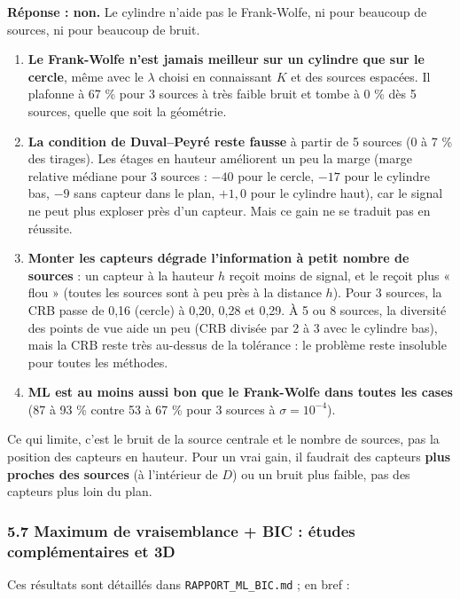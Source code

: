 \documentclass[
  french,
]{article}
\providecommand{\tightlist}{%
  \setlength{\itemsep}{0pt}\setlength{\parskip}{0pt}}
\begin{document}
\textbf{Réponse : non.} Le cylindre n'aide pas le Frank-Wolfe, ni pour
beaucoup de sources, ni pour beaucoup de bruit.

\begin{enumerate}
\def\labelenumi{\arabic{enumi}.}
\tightlist
\item
  \textbf{Le Frank-Wolfe n'est jamais meilleur sur un cylindre que sur
  le cercle}, même avec le \(\lambda\) choisi en connaissant \(K\) et
  des sources espacées. Il plafonne à 67 \% pour 3 sources à très faible
  bruit et tombe à 0 \% dès 5 sources, quelle que soit la géométrie.
\item
  \textbf{La condition de Duval--Peyré reste fausse} à partir de 5
  sources (0 à 7 \% des tirages). Les étages en hauteur améliorent un
  peu la marge (marge relative médiane pour 3 sources : \(-40\) pour le
  cercle, \(-17\) pour le cylindre bas, \(-9\) sans capteur dans le
  plan, \(+1{,}0\) pour le cylindre haut), car le signal ne peut plus
  exploser près d'un capteur. Mais ce gain ne se traduit pas en
  réussite.
\item
  \textbf{Monter les capteurs dégrade l'information à petit nombre de
  sources} : un capteur à la hauteur \(h\) reçoit moins de signal, et le
  reçoit plus « flou » (toutes les sources sont à peu près à la distance
  \(h\)). Pour 3 sources, la CRB passe de 0,16 (cercle) à 0,20, 0,28 et
  0,29. À 5 ou 8 sources, la diversité des points de vue aide un peu
  (CRB divisée par 2 à 3 avec le cylindre bas), mais la CRB reste très
  au-dessus de la tolérance : le problème reste insoluble pour toutes
  les méthodes.
\item
  \textbf{ML est au moins aussi bon que le Frank-Wolfe dans toutes les
  cases} (87 à 93 \% contre 53 à 67 \% pour 3 sources à
  \(\sigma = 10^{-4}\)).
\end{enumerate}

Ce qui limite, c'est le bruit de la source centrale et le nombre de
sources, pas la position des capteurs en hauteur. Pour un vrai gain, il
faudrait des capteurs \textbf{plus proches des sources} (à l'intérieur
de \(D\)) ou un bruit plus faible, pas des capteurs plus loin du plan.

\subsubsection{5.7 Maximum de vraisemblance + BIC : études
complémentaires et
3D}\label{maximum-de-vraisemblance-bic-uxe9tudes-compluxe9mentaires-et-3d}

Ces résultats sont détaillés dans \texttt{RAPPORT\_ML\_BIC.md} ; en bref
:
\end{document}

